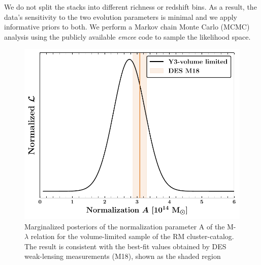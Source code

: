 We do not split the stacks into different richness or redshift bins.
As a result, the data's sensitivity to the two evolution parameters is minimal and we apply informative priors to both.
We perform a Markov chain Monte Carlo (MCMC) analysis %
using the publicly available \emph{emcee} \citep{mackey13} code to sample the likelihood space.
\begin{figure}
\includegraphics[width=\linewidth]{figs/M_rich_fitting_y3_v6_4_22_full_vl_JODY.pdf}
\caption{Marginalized posteriors of the normalization parameter A of the M-$\lambda$ relation for the volume-limited sample of the RM cluster-catalog. The result is consistent with the best-fit values obtained by DES weak-lensing measurements (M18), shown as the shaded region}
\end{figure}

